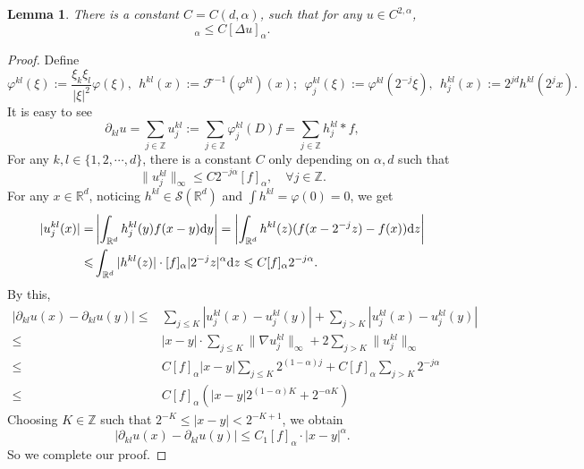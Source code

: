 \documentclass[twoside, 12pt]{book}
\numberwithin{equation}{chapter}
\newtheorem{lemma}[theorem]{Lemma}
\def\mR{{\mathbb R}}
\def\mZ{{\mathbb Z}}
\def\sF{{\mathscr F}}
\def\sS{{\mathscr S}}
\def\leq{\leqslant}
\def\p{\partial}
\def\d{\text{\rm{d}}}
\begin{document}
	\begin{lemma}
		There is a constant $C=C(d, \alpha)$, such that for any $u\in C^{2,\alpha}$, 
		\begin{equation}
			[\nabla^2 u]_\alpha \leq C [\Delta u]_\alpha. 
		\end{equation}
	\end{lemma}
	\begin{proof}
		Define 
		$$
		\varphi^{kl} (\xi):= \frac{\xi_k\xi_l}{|\xi|^2} \varphi (\xi),\ \  h^{kl}(x):=\sF^{-1}(\varphi^{kl})(x);  \ \ \varphi^{kl}_j (\xi):= \varphi^{kl}(2^{-j}\xi), \ \ h^{kl}_j(x):=2^{jd} h^{kl}(2^jx). 
		$$
		It is easy to see
		$$
		\p_{kl}u=\sum_{j\in \mZ} u^{kl}_j:=\sum_{j\in \mZ}\varphi^{kl}_j (D) f=\sum_{j\in \mZ} h^{kl}_j* f, 
		$$
		For any $k,l\in \{1,2,\cdots, d\}$, there is a constant $C$ only depending on $\alpha, d$ such that 
		\begin{equation}
			\|u^{kl}_j\|_\infty\leq C 2^{-j\alpha} [f]_\alpha,\quad \forall j\in \mZ. 
		\end{equation}
		For any $x\in \mR^d$, noticing $h^{kl}\in \sS(\mR^d)$ and $\int h^{kl}=\varphi (0)=0$, we get 
		\begin{align*}
			|u^{kl}_j(x)|=&\left|\int_{\mR^d} h^{kl}_j (y)f(x-y) \d y\right|=\left|\int_{\mR^d} h^{kl} (z)(f(x-2^{-j}z)-f(x)) \d z\right| \\
			\leq&  \int_{\mR^d} |h^{kl}(z)| \cdot [f]_\alpha |2^{-j}z|^\alpha  \d z\leq C [f]_\alpha 2^{-j\alpha}. 
		\end{align*}
		By this, 
		\begin{align*}
			|\p_{kl}u(x)-\p_{kl}u(y)|\leq& \sum_{j\leq K} |u^{kl}_j(x)-u^{kl}_j(y)|+\sum_{j>K} |u^{kl}_j(x)-u^{kl}_j(y)|\\
			\leq &  |x-y|\cdot \sum_{j\leq K}   \|\nabla u^{kl}_j\|_\infty+2\sum_{j>K}  \|u^{kl}_j\|_\infty\\
			\leq & C [f]_\alpha |x-y| \sum_{j\leq K} 2^{(1-\alpha)j}+ C [f]_\alpha\sum_{j>K} 2^{-j\alpha}\\
			\leq & C [f]_\alpha \left(|x-y| 2^{(1-\alpha)K} + 2^{-\alpha K}\right)
		\end{align*}
		Choosing $K\in \mZ$ such that $2^{-K}\leq |x-y|<2^{-K+1}$, we obtain 
		$$
		|\p_{kl}u(x)-\p_{kl}u(y)|\leq C_1[f]_\alpha\cdot |x-y|^\alpha.  
		$$
		So we complete our proof. 
	\end{proof}
	
\end{document}
